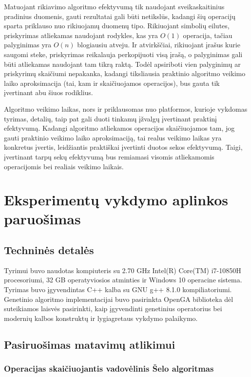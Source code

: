 \documentclass{VUMIFInfKursinis}
\begin{document}
Matuojant rikiavimo algoritmo efektyvumą tik naudojant sveikaskaitinius pradinius duomenis, gauti rezultatai gali būti netikslūs,
kadangi šių operacijų sparta priklauso nuo rikiuojamų duomenų tipo.
Rikiuojant simbolių eilutes, priskyrimas atliekamas naudojant rodykles, kas yra $O(1)$ operacija,
tačiau palyginimas yra $O(n)$ blogiausiu atveju.
Ir atvirkščiai, rikiuojant įrašus kurie saugomi steke, priskyrimas reikalauja perkopijuoti visą įrašą,
o palyginimas gali būti atliekamas naudojant tam tikrą raktą.
Todėl apsiriboti vien palyginimų ar priskyrimų skaičiumi nepakanka, kadangi tiksliausia praktinio algoritmo
veikimo laiko aproksimacija (tai, kam ir skaičiuojamos operacijos), bus gauta tik įvertinant abu šiuos rodiklius.

Algoritmo veikimo laikas, nors ir priklausomas nuo platformos, kurioje vykdomas tyrimas, detalių,
taip pat gali duoti tinkamų įžvalgų įvertinant praktinį efektyvumą.
Kadangi algoritmo atliekamos operacijos skaičiuojamos tam, jog gauti praktinio
veikimo laiko aproksimaciją, tai realus veikimo laikas
yra konkretus įvertis, leidžiantis praktiškai įvertinti duotos sekos efektyvumą.
Taigi, įvertinant tarpų sekų efektyvumą bus remiamasi visomis atliekamomis operacijomis bei realiais veikimo laikais.

\section{Eksperimentų vykdymo aplinkos paruošimas}

\subsection{Techninės detalės}
Tyrimui buvo naudotas kompiuteris su 2.70 GHz Intel(R) Core(TM) i7-10850H procesoriumi,
32 GB operatyviosios atminties ir Windows 10 operacine sistema.
Tyrimas buvo įgyvendintas C++ kalba su GNU g++ 8.1.0 kompiliatoriumi.
Genetinio algoritmo implementacijai buvo pasirinkta OpenGA biblioteka \cite{mohammadi2017openga}
dėl suteikiamos laisvės pasirinkti, kaip įgyvendinti genetinius operatorius bei modernių kalbos konstruktų ir lygiagretaus vykdymo palaikymo.

\subsection{Pasiruošimas matavimų atlikimui}

\subsubsection{Operacijas skaičiuojantis vadovėlinis Šelo algoritmas}
\end{document}
